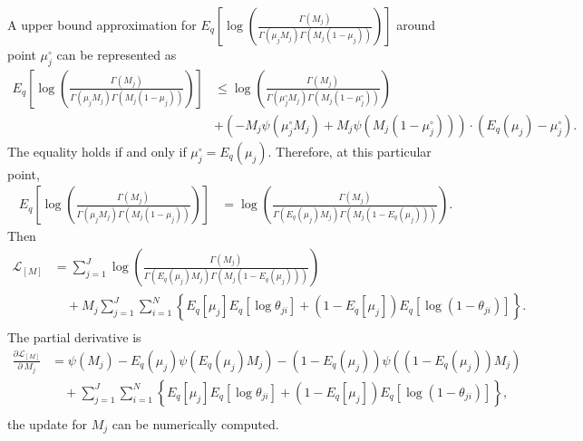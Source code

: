 \documentclass[11pt,reqno]{amsart}
\begin{document}
%
A upper bound approximation for $ E_q  \left[ \log \left( \frac{ \Gamma(M_j) } { \Gamma(\mu_j M_j) \Gamma(M_j (1-\mu_j)) }\right) \right] $ around point $ \mu_j^{\circ} $ can be represented as
\begin{equation}
\begin{split}
E_q  \left[ \log \left( \frac{ \Gamma(M_j) } { \Gamma(\mu_j M_j) \Gamma(M_j (1-\mu_j)) }\right) \right] &\leq \log\left( \frac{\Gamma(M_j)}{\Gamma(\mu_j^{\circ} M_j) \Gamma(M_j (1-\mu_j^{\circ} ))}\right) \\
\quad &+ \left( -M_j \psi (\mu_j^{\circ} M_j) + M_j \psi(M_j (1-\mu_j^{\circ} ))\right) \cdot (E_q(\mu_j)-\mu_j^{\circ}).\nonumber
\end{split}
\end{equation}
%
The equality holds if and only if $ \mu_j^{\circ} =E_q(\mu_j) $.
Therefore, at this particular point,
\begin{equation}
\begin{split}
E_q  \left[ \log \left( \frac{ \Gamma(M_j) } { \Gamma(\mu_j M_j) \Gamma(M_j (1-\mu_j)) }\right) \right] &= \log\left( \frac{\Gamma(M_j)}{\Gamma(E_q(\mu_j) M_j) \Gamma(M_j (1-E_q(\mu_j) ))}\right).\nonumber
\end{split}
\end{equation}
%
Then
\begin{equation}
\begin{split}
\mathcal{L}_{{[M]}}
&= \sum_{j=1}^{J} \log\left( \frac{\Gamma(M_j)}{\Gamma(E_q(\mu_j) M_j) \Gamma(M_j (1-E_q(\mu_j) ))}\right) \\
&\quad + M_j \sum_{j=1}^{J} \sum_{i=1}^{N} \left\lbrace E_q \left[ \mu_j \right] E_q \left[ \log \theta_{ji} \right] + \left( 1 - E_q\left[ \mu_j \right]  \right) E_q\left[ \log \left( 1 - \theta_{ji}\right) \right] \right\rbrace. \\
\end{split}
\end{equation}
%
The partial derivative is
\begin{equation}
\begin{split}
\frac{\partial \mathcal{L}_{{[M]}} }{\partial \ M_j}
&= \psi(M_j) - E_q(\mu_j) \psi(E_q(\mu_j) M_j)
- (1-E_q(\mu_j)) \psi((1-E_q(\mu_j)) M_j) \\
&\quad + \sum_{j=1}^{J} \sum_{i=1}^{N} \left\lbrace E_q \left[ \mu_j \right] E_q \left[ \log \theta_{ji} \right]
+ \left( 1 - E_q\left[ \mu_j \right]  \right) E_q\left[ \log \left( 1 - \theta_{ji}\right) \right] \right\rbrace, \\
\end{split}
\end{equation}
%
the update for $ M_j $ can be numerically computed.




\end{document}
